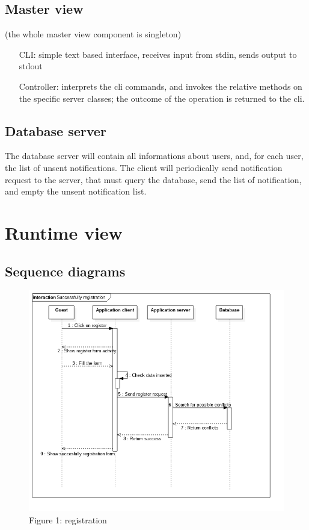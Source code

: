 	\subsection{Master view}
	(the whole master view component is singleton)
	\begin{itemize}
	  \item [CLI:] simple text based interface, receives input from stdin, sends output to stdout
	  \item [Controller:] interprets the cli commands, and invokes the relative methods on the specific server classes;
	  the outcome of the operation is returned to the cli.
	\end{itemize}
	\subsection{Database server}
	The database server will contain all informations about users, and, for each user, the list of unsent notifications.
	The client will periodically send notification request to the server, that must query the database, send the list of notification,
	and empty the unsent notification list.
\section{Runtime view}
	\subsection{Sequence diagrams}
\begin{figure} [h]
\centering\includegraphics[scale=0.5]{Sequence Diagrams/successfully_registration.png}
\caption{Figure 1: registration }
\end{figure}

